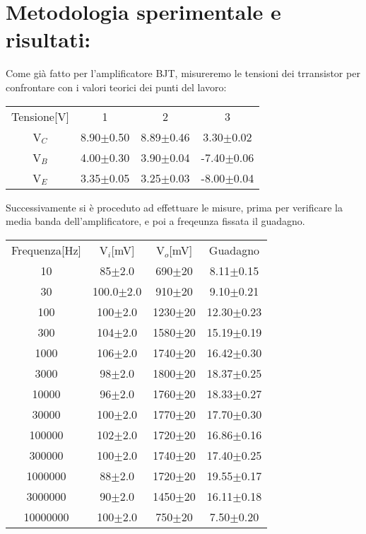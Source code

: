 \documentclass{article}
\begin{document}
\section{Metodologia sperimentale e risultati:}
Come già fatto per l'amplificatore BJT, misureremo le tensioni dei  trransistor per confrontare con i valori teorici dei punti del lavoro:
\begin{table}[]
    \begin{center}
        \begin{tabular}{c|c|c|c}
        Tensione[V]&1&2&3\\
      V$_{C}$&8.90$\pm$0.50&8.89$\pm$0.46&3.30$\pm$0.02\\
      V$_{B}$&4.00$\pm$0.30&3.90$\pm$0.04&-7.40$\pm$0.06\\
      V$_{E}$&3.35$\pm$0.05&3.25$\pm$0.03&-8.00$\pm$0.04\\
      \end{tabular}
   \end{center}
\end{table} 
Successivamente si è proceduto ad effettuare le misure, prima per verificare la media banda dell'amplificatore, e poi a freqeunza fissata il guadagno.
~
\begin{table}[]
    \begin{center}
        \begin{tabular}{c|c|c|c}
        Frequenza[Hz]&V$_{i}$[mV]&V$_{o}$[mV]&Guadagno\\
        10&85$\pm$2.0&690$\pm$20&8.11$\pm$0.15\\
        30&100.0$\pm$2.0&910$\pm$20&9.10$\pm$0.21\\
        100&100$\pm$2.0&1230$\pm$20&12.30$\pm$0.23\\
        300&104$\pm$2.0&1580$\pm$20&15.19$\pm$0.19\\
        1000&106$\pm$2.0&1740$\pm$20&16.42$\pm$0.30\\
        3000&98$\pm$2.0&1800$\pm$20&18.37$\pm$0.25\\
        10000&96$\pm$2.0&1760$\pm$20&18.33$\pm$0.27\\
        30000&100$\pm$2.0&1770$\pm$20&17.70$\pm$0.30\\
        100000&102$\pm$2.0&1720$\pm$20&16.86$\pm$0.16\\
        300000&100$\pm$2.0&1740$\pm$20&17.40$\pm$0.25\\
        1000000&88$\pm$2.0&1720$\pm$20&19.55$\pm$0.17\\
        3000000&90$\pm$2.0&1450$\pm$20&16.11$\pm$0.18\\
        10000000&100$\pm$2.0&750$\pm$20&7.50$\pm$0.20\\
        \end{tabular}
   \end{center}
\end{table} 
\end{document}
